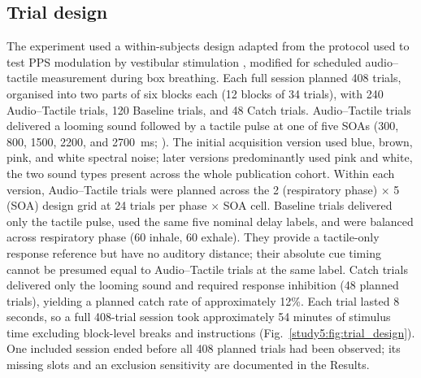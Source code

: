 \subsection{Trial design}

The experiment used a within-subjects design adapted from the protocol used to test PPS modulation by vestibular stimulation \citep{pfeiffer2018vestibular}, modified for scheduled audio--tactile measurement during box breathing. Each full session planned 408 trials, organised into two parts of six blocks each (12 blocks of 34 trials), with 240 Audio--Tactile trials, 120 Baseline trials, and 48 Catch trials. Audio--Tactile trials delivered a looming sound followed by a tactile pulse at one of five SOAs (300, 800, 1500, 2200, and 2700~ms; \citealt{lee2021altered, mine2022adaptation, teneggi2013social}). The initial acquisition version used blue, brown, pink, and white spectral noise; later versions predominantly used pink and white, the two sound types present across the whole publication cohort. Within each version, Audio--Tactile trials were planned across the 2 (respiratory phase) $\times$ 5 (SOA) design grid at 24 trials per phase $\times$ SOA cell. Baseline trials delivered only the tactile pulse, used the same five nominal delay labels, and were balanced across respiratory phase (60 inhale, 60 exhale). They provide a tactile-only response reference but have no auditory distance; their absolute cue timing cannot be presumed equal to Audio--Tactile trials at the same label. Catch trials delivered only the looming sound and required response inhibition (48 planned trials), yielding a planned catch rate of approximately 12\%. Each trial lasted 8 seconds, so a full 408-trial session took approximately 54 minutes of stimulus time excluding block-level breaks and instructions (Fig.~\ref{study5:fig:trial_design}). One included session ended before all 408 planned trials had been observed; its missing slots and an exclusion sensitivity are documented in the Results.

